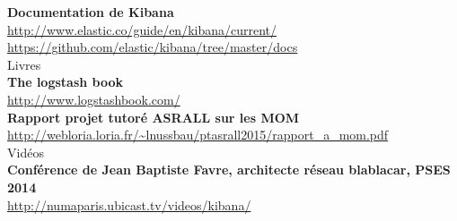 \textbf{Documentation de Kibana}\\
\url{http://www.elastic.co/guide/en/kibana/current/}\\
\url{https://github.com/elastic/kibana/tree/master/docs}\\[1mm]


{\huge Livres}\\[5mm]

\textbf{The logstash book}\\
\url{http://www.logstashbook.com/}\\[1mm]

\textbf{Rapport projet tutoré ASRALL sur les MOM}\\
\url{http://webloria.loria.fr/~lnussbau/ptasrall2015/rapport\_a\_mom.pdf}\\[1mm]

{\huge Vidéos}\\[5mm]

\textbf{Conférence de Jean Baptiste Favre, architecte réseau blablacar, PSES 2014}\\
\url{http://numaparis.ubicast.tv/videos/kibana/}
